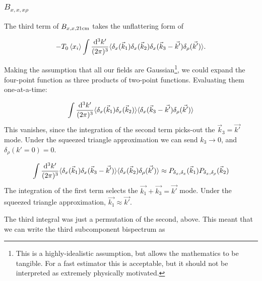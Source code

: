\subsubsection*{$B_{x,x,x\rho}$}
\label{subsubsec:B_xxxrho}
The third term of $B_{x,x,{\rm 21cm}}$ takes the unflattering form of

\begin{equation}
- T_0 \left\langle x_i \right\rangle \int \frac{{\rm d^3}k'}{(2\pi)^3} 
\langle \delta_x(\vec{k}_1) \delta_x(\vec{k}_2) \delta_x(\vec{k}_3 - \vec{k'})\delta_{\rho}(\vec{k'}) \rangle .
\end{equation}

Making the assumption that all our fields are Gaussian\footnote{This is a highly-idealistic assumption, but allows the mathematics to be tangible. For a fast estimator this is acceptable, but it should not be interpreted as extremely physically motivated.}, we could expand the four-point function as three products of two-point functions. Evaluating them one-at-a-time:

\begin{equation}
\int \frac{{\rm d^3}k'}{(2\pi)^3} \langle \delta_x(\vec{k}_1) \delta_x(\vec{k}_2) \rangle \langle \delta_x(\vec{k}_3 - \vec{k'})\delta_{\rho}(\vec{k'}) \rangle
\end{equation}
This vanishes, since the integration of the second term picks-out the $\vec{k}_3 = \vec{k'}$ mode. Under the squeezed triangle approximation we can send $k_3 \rightarrow 0$, and $\delta_{\rho}(k'=0)=0$.

\begin{equation}
\int \frac{{\rm d^3}k'}{(2\pi)^3} \langle \delta_x(\vec{k}_1)\delta_x(\vec{k}_3 - \vec{k'}) \rangle \langle \delta_x(\vec{k}_2) \delta_{\rho}(\vec{k'}) \rangle \approx P_{\delta_x, \delta_x}(\vec{k}_1) P_{\delta_x, \delta_{\rho}}(\vec{k}_2) 
\end{equation}
The integration of the first term selects the $\vec{k_1} + \vec{k_3} = \vec{k'}$ mode. Under the squeezed triangle approximation, $\vec{k_1} \approx \vec{k'}$.

The third integral was just a permutation of the second, above. This meant that we can write the third subcomponent bispectrum as

